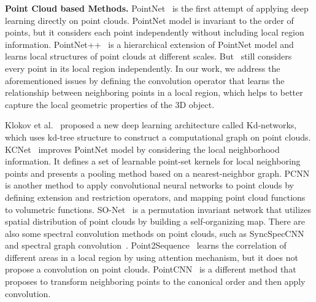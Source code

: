 \documentclass[10pt,twocolumn,letterpaper]{article}
\begin{document}
\textbf{Point Cloud based Methods.} PointNet~\cite{qi2017pointnet} is the first attempt of applying deep learning directly on point clouds. PointNet model is invariant to the order of points, but it considers each point independently without including local region information. PointNet++~\cite{qi2017pointnet++} is a hierarchical extension of PointNet model and learns local structures of point clouds at different scales. But~\cite{qi2017pointnet++} still considers every point in its local region independently. 
In our work, we address the aforementioned issues by defining the convolution operator that learns the relationship between neighboring points in a local region, which helps to better capture the local geometric properties of the 3D object.


Klokov et al.~\cite{klokov2017escape} proposed a new deep learning architecture called Kd-networks, which uses kd-tree structure to construct a computational graph on point clouds. KCNet~\cite{shen2018mining} improves PointNet model by considering the local neighborhood information. It defines a set of learnable point-set kernels for local neighboring points and presents a pooling method based on a nearest-neighbor graph. PCNN~\cite{atzmon2018point} is another method to apply convolutional neural networks to point clouds by defining extension and restriction operators, and mapping point cloud functions to volumetric functions. SO-Net~\cite{li2018so} is a permutation invariant network that utilizes spatial distribution of point clouds by building a self-organizing map. There are also some spectral convolution methods on point clouds, such as SyncSpecCNN~\cite{yi2017syncspeccnn} and spectral graph convolution~\cite{Wang_2018_ECCV}.
Point2Sequence~\cite{liu2018point2sequence} learns the correlation of different areas in a local region by using attention mechanism, but it does not propose a convolution on point clouds.
PointCNN~\cite{li2018pointcnn} is a different method that proposes to transform neighboring points to the canonical order and then apply convolution.
\end{document}
